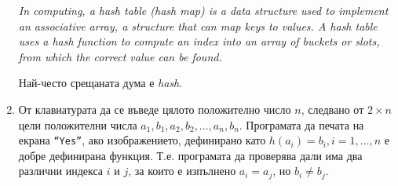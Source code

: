 \documentclass[12pt,a4paper]{article}
\begin{document}
\begin{enumerate}
	\textit{In computing, a hash table (hash map) is a data structure used to implement an associative array, a structure that can map keys to values. A hash table uses a hash function to compute an index into an array of buckets or slots, from which the correct value can be found.}

	Най-често срещаната дума е \textit{hash}.

	\item От клавиатурата да се въведе цялото положително число $n$, следвано от $2 \times n$ цели положителни числа $a_1, b_1, a_2, b_2, ..., a_n, b_n$. Програмата да печата на екрана \texttt{``Yes''}, ако изображението, дефинирано като $h(a_i)=b_i,i=1,...,n$ е добре дефинирана функция. Т.е. програмата да проверява дали има два различни индекса $i$ и $j$, за които е изпълнено $a_i=a_j$, но $b_i \neq b_j$.


\end{enumerate}
\end{document}
